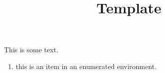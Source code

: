 \documentclass{article}
\title{Template}
\begin{document}
\maketitle
This is some text. 

\begin{enumerate}
\item this is an item in an enumerated environment. 
\end{enumerate}
\end{document}
